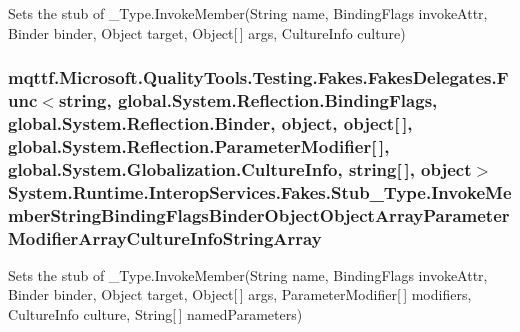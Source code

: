 Sets the stub of \-\_\-\-Type.\-Invoke\-Member(\-String name, Binding\-Flags invoke\-Attr, Binder binder, Object target, Object\mbox{[}$\,$\mbox{]} args, Culture\-Info culture)

\hypertarget{class_system_1_1_runtime_1_1_interop_services_1_1_fakes_1_1_stub___type_ae229c26415872e2a33d4e2b8e3ba3662}{
\subsubsection[{Invoke\-Member\-String\-Binding\-Flags\-Binder\-Object\-Object\-Array\-Parameter\-Modifier\-Array\-Culture\-Info\-String\-Array}]{\setlength{\rightskip}{0pt plus 5cm}mqttf.\-Microsoft.\-Quality\-Tools.\-Testing.\-Fakes.\-Fakes\-Delegates.\-Func$<$string, global.\-System.\-Reflection.\-Binding\-Flags, global.\-System.\-Reflection.\-Binder, object, object\mbox{[}$\,$\mbox{]}, global.\-System.\-Reflection.\-Parameter\-Modifier\mbox{[}$\,$\mbox{]}, global.\-System.\-Globalization.\-Culture\-Info, string\mbox{[}$\,$\mbox{]}, object$>$ System.\-Runtime.\-Interop\-Services.\-Fakes.\-Stub\-\_\-\-Type.\-Invoke\-Member\-String\-Binding\-Flags\-Binder\-Object\-Object\-Array\-Parameter\-Modifier\-Array\-Culture\-Info\-String\-Array}}\label{class_system_1_1_runtime_1_1_interop_services_1_1_fakes_1_1_stub___type_ae229c26415872e2a33d4e2b8e3ba3662}


Sets the stub of \-\_\-\-Type.\-Invoke\-Member(\-String name, Binding\-Flags invoke\-Attr, Binder binder, Object target, Object\mbox{[}$\,$\mbox{]} args, Parameter\-Modifier\mbox{[}$\,$\mbox{]} modifiers, Culture\-Info culture, String\mbox{[}$\,$\mbox{]} named\-Parameters)

